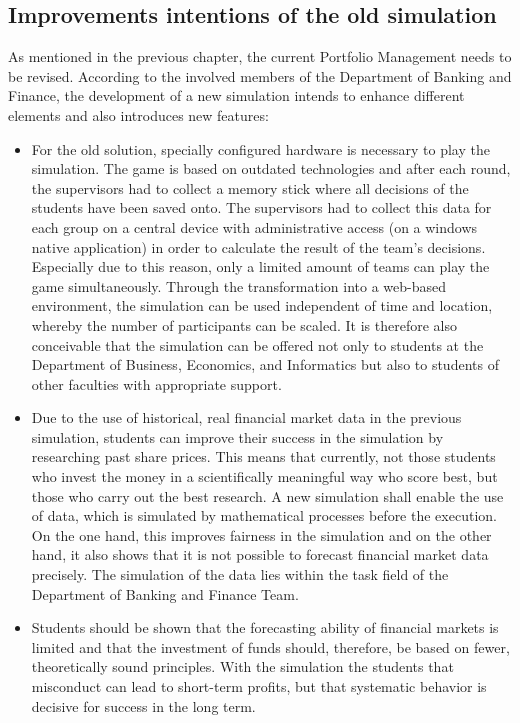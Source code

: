 \subsection{Improvements intentions of the old simulation}
As mentioned in the previous chapter, the current Portfolio Management needs to be revised. According to the involved members of the Department of Banking and Finance, the development of a new simulation intends to enhance different elements and also introduces new features:
\begin{itemize}
  \item For the old solution, specially configured hardware is necessary to play the simulation. The game is based on outdated technologies and after each round, the supervisors had to collect a memory stick where all decisions of the students have been saved onto. The supervisors had to collect this data for each group on a central device with administrative access (on a windows native application) in order to calculate the result of the team's decisions. Especially due to this reason, only a limited amount of teams can play the game simultaneously. Through the transformation into a web-based environment, the simulation can be used independent of time and location, whereby the number of participants can be scaled. It is therefore also conceivable that the simulation can be offered not only to students at the Department of Business, Economics, and Informatics but also to students of other faculties with appropriate support.
  \item Due to the use of historical, real financial market data in the previous simulation, students can improve their success in the simulation by researching past share prices. This means that currently, not those students who invest the money in a scientifically meaningful way who score best, but those who carry out the best research. A new simulation shall enable the use of data, which is simulated by mathematical processes before the execution. On the one hand, this improves fairness in the simulation and on the other hand, it also shows that it is not possible to forecast financial market data precisely. The simulation of the data lies within the task field of the Department of Banking and Finance Team.
  \item Students should be shown that the forecasting ability of financial markets is limited and that the investment of funds should, therefore, be based on fewer, theoretically sound principles. With the simulation the students that misconduct can lead to short-term profits, but that systematic behavior is decisive for success in the long term.
\end{itemize}

